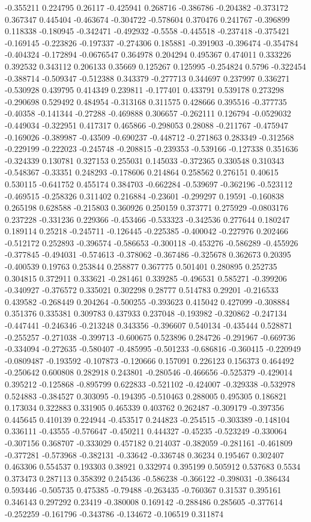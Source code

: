 -0.355211 0.224795 0.26117 -0.425941 0.268716 -0.386786 -0.204382 -0.373172 0.367347 0.445404 -0.463674 -0.304722 -0.578604 0.370476 0.241767 -0.396899 0.118338 -0.180945 -0.342471 -0.492932 -0.5558 -0.445518 -0.237418 -0.375421 -0.169145 -0.223826 -0.197337 -0.274306 0.185881 -0.391903 -0.396474 -0.354784 -0.404324 -0.172894 -0.0676547 0.364978 0.204294 0.495367 0.474011 0.333226 0.392532 0.343112 0.206133 0.35669 0.125267 0.125995 -0.254824 0.5796 -0.322454 -0.388714 -0.509347 -0.512388 0.343379 -0.277713 0.344697 0.237997 0.336271 -0.530928 0.439795 0.414349 0.239811 -0.177401 0.433791 0.539178 0.273298 -0.290698 0.529492 0.484954 -0.313168 0.311575 0.428666 0.395516 -0.377735 -0.40358 -0.141344 -0.27288 -0.469888 0.306657 -0.262111 0.126794 -0.0529032 -0.449034 -0.322951 0.417317 0.465866 -0.298053 0.28088 -0.211767 -0.475947 -0.169026 -0.389987 -0.43509 -0.690237 -0.448712 -0.271863 0.283349 -0.312568 -0.229199 -0.222023 -0.245748 -0.208815 -0.239353 -0.539166 -0.127338 0.351636 -0.324339 0.130781 0.327153 0.255031 0.145033 -0.372365 0.330548 0.310343 -0.548367 -0.33351 0.248293 -0.178606 0.214864 0.258562 0.276151 0.40615 0.530115 -0.641752 0.455174 0.384703 -0.662284 -0.539697 -0.362196 -0.523112 -0.469515 -0.258326 0.311402 0.216884 -0.23601 -0.299297 0.19591 -0.160838 0.265198 0.628588 -0.215803 0.360926 0.250159 0.373771 0.275929 -0.0803176 0.237228 -0.331236 0.229366 -0.453466 -0.533323 -0.342536 0.277644 0.180247 0.189114 0.25218 -0.245711 -0.126445 -0.225385 -0.400042 -0.227976 0.202466 -0.512172 0.252893 -0.396574 -0.586653 -0.300118 -0.453276 -0.586289 -0.455926 -0.377845 -0.494031 -0.574613 -0.378062 -0.367486 -0.325678 0.362673 0.20395 -0.400539 0.19763 0.253844 0.258877 0.367775 0.501401 0.280895 0.252735 0.304815 0.372911 0.333621 -0.281461 0.339285 -0.496531 0.585271 -0.399206 -0.340927 -0.376572 0.335021 0.302298 0.28777 0.514783 0.29201 -0.216533 0.439582 -0.268449 0.204264 -0.500255 -0.393623 0.415042 0.427099 -0.308884 0.351376 0.335381 0.309783 0.437933 0.237048 -0.193982 -0.320862 -0.247134 -0.447441 -0.246346 -0.213248 0.343356 -0.396607 0.540134 -0.435444 0.528871 -0.255257 -0.271038 -0.399713 -0.600675 0.523896 0.284726 -0.291967 -0.669736 -0.334094 -0.272635 -0.580407 -0.485995 -0.501233 -0.686816 -0.360415 -0.220949 -0.0809487 -0.193592 -0.107873 -0.120666 0.157091 0.226123 0.156373 0.464492 -0.250642 0.600808 0.282918 0.243801 -0.280546 -0.466656 -0.525379 -0.429014 0.395212 -0.125868 -0.895799 0.622833 -0.521102 -0.424007 -0.329338 -0.532978 0.524883 -0.384527 0.303095 -0.194395 -0.510463 0.288005 0.495305 0.186821 0.173034 0.322883 0.331905 0.465339 0.403762 0.262487 -0.309179 -0.397356 0.445645 0.410139 0.224944 -0.453517 0.244823 -0.254515 -0.303389 -0.148104 0.336111 -0.43555 -0.576647 -0.450211 0.444327 -0.45235 -0.523249 -0.330064 -0.307156 0.368707 -0.333029 0.457182 0.214037 -0.382059 -0.281161 -0.461809 -0.377281 -0.573968 -0.382131 -0.33642 -0.336748 0.36234 0.195467 0.302407 0.463306 0.554537 0.193303 0.38921 0.332974 0.395199 0.505912 0.537683 0.5534 0.373473 0.287113 0.358392 0.245436 -0.586238 -0.366122 -0.398031 -0.386434 0.593446 -0.505735 0.475385 -0.79488 -0.263435 -0.760367 0.31537 0.395161 0.346143 0.297292 0.23419 -0.380008 0.169142 -0.288486 0.285605 -0.377614 -0.252259 -0.161796 -0.343786 -0.134672 -0.106519 0.311874 